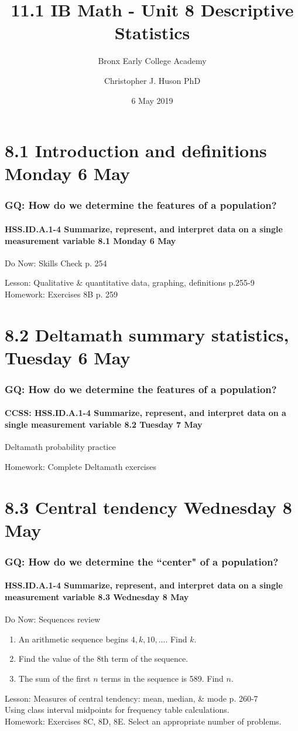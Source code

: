 \documentclass{beamer}
\title{11.1 IB Math - Unit 8 Descriptive Statistics}
\subtitle{Bronx Early College Academy}
\author{Christopher J. Huson PhD}
\date{6 May 2019}
\begin{document}
  \frame{\titlepage}
  \section[Outline]{}
  \frame{\tableofcontents}

\section{8.1 Introduction and definitions Monday 6 May}
  \frame
  {
    \frametitle{GQ: How do we determine the features of a population?}
    \framesubtitle{HSS.ID.A.1-4 Summarize, represent, and interpret data on a single measurement variable \hfill \alert{8.1 Monday 6 May}}

    \begin{block}{Do Now: Skills Check p. 254}
    \end{block}
    Lesson: Qualitative \& quantitative data, graphing, definitions p.255-9\\[1cm]
    Homework: Exercises 8B p. 259
  }

\section{8.2 Deltamath summary statistics, Tuesday 6 May}
  \frame
  {
    \frametitle{GQ: How do we determine the features of a population?}
    \framesubtitle{CCSS: HSS.ID.A.1-4 Summarize, represent, and interpret data on a single measurement variable \hfill \alert{8.2 Tuesday 7 May}}

    \begin{block}{Deltamath probability practice}
    \end{block}
    Homework: Complete Deltamath exercises
  }

\section{8.3 Central tendency Wednesday 8 May}
  \frame
  {
    \frametitle{GQ: How do we determine the ``center" of a population?}
    \framesubtitle{HSS.ID.A.1-4 Summarize, represent, and interpret data on a single measurement variable \hfill \alert{8.3 Wednesday 8 May}}

    \begin{block}{Do Now: Sequences review}
      \begin{enumerate}
        \item An arithmetic sequence begins $4, k, 10, ...$. Find $k$.
        \item Find the value of the 8th term of the sequence.
        \item The sum of the first $n$ terms in the sequence is 589. Find $n$.
    \end{enumerate}
    \end{block}
    Lesson: Measures of central tendency: mean, median, \& mode p. 260-7\\
    Using class interval midpoints for frequency table calculations.\\[0.5cm]
    Homework: Exercises 8C, 8D, 8E. Select an appropriate number of problems.
  }
\end{document}

